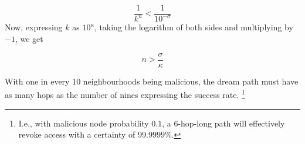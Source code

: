 \begin{equation}
    \frac{1}{k^n}< \frac{1}{10^{-\sigma}}
\end{equation}
Now, expressing $k$ as $10^\kappa$, taking the logarithm of both sides and multiplying by $-1$, we get

\begin{equation}
    n > \frac{\sigma}{\kappa}
\end{equation}

With one in every 10 neighbourhoods being malicious, the dream path must have as many hops as the number of nines expressing the success rate.%
%
\footnote{I.e., with malicious node probability $0.1$, a 6-hop-long path will effectively revoke access with a certainty of $99.9999\%$.}









 